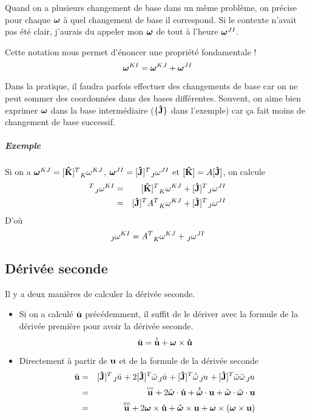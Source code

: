 Quand on a plusieurs changement de base dans un même problème, on précise pour chaque ${\bm \omega}$ à quel changement de base il correspond.
Si le contexte n'avait pas été clair, j'aurais du appeler mon ${\bm \omega}$ de tout à l'heure ${\bm \omega}^{JI}$.

Cette notation nous permet d'énoncer une propriété fondamentale !
\[ {\bm \omega}^{KI} = {\bm \omega}^{KJ} + {\bm \omega}^{JI} \]

Dans la pratique, il faudra parfois effectuer des changements de base car on ne peut sommer des coordonnées dans des bases différentes.
Souvent, on aime bien exprimer ${\bm \omega}$ dans la base intermédiaire ($\{{\bf\hat{J}}\}$ dans l'exemple) car ça fait moins de changement de base successif.

\subparagraph{Exemple}
Si on a $\omegaf^{KJ} = [\uk]^T \wtr{K}{\omega}{KJ}$, $\omegaf^{JI} = [\uj]^T \wtr{J}{\omega}{JI}$ et $[{\bf\hat{K}}] = A[{\bf\hat{J}}]$, on calcule
\begin{eqnarray*}
  [\uj]^T \wtr{J}{\omega}{KI} &=& [\uk]^T \wtr{K}{\omega}{KJ} + [\uj]^T \wtr{J}{\omega}{JI}\\
                              &=& [\uj]^T A^T \wtr{K}{\omega}{KJ} + [\uj]^T \wtr{J}{\omega}{JI}
\end{eqnarray*}
D'où
\[ \wtr{J}{\omega}{KI} = A^T \wtr{K}{\omega}{KJ} + \wtr{J}{\omega}{JI} \]

\subsection{Dérivée seconde}
Il y a deux manières de calculer la dérivée seconde.
\begin{itemize}
  \item
    Si on a calculé $\dot{\bf u}$ précédemment, il suffit de le dériver avec la formule de la dérivée première pour avoir la dérivée seconde.
    \[ \ddot{\bf u} = \mathring{\dot{\bf u}} + {\bm \omega} \times \dot{\bf u} \]
  \item
    Directement à partir de ${\bf u}$ et de la formule de la dérivée seconde
    \begin{eqnarray*}
      \fvdd{u} &=&  [\uj]^T \wrt{J}{\ddot{u}} + 2 [\uj]^T \omegat\wrt{J}{\dot{u}} + [\uj]^T \dot{\omegat}\wrt{J}{u} + [\uj]^T \omegat\omegat\wrt{J}{u}\\
               &=& \fvrr{u} + 2 \omegaft \cdot \fvr{u} + \omegaftr \cdot \fv{u} + \omegaft \cdot \omegaft \cdot \fv{u}\\
               &=& \fvrr{u} + 2 \omegaf \times \fvr{u} + \omegafr \times \fv{u} + \omegaf \times (\omegaf \times \fv{u})
    \end{eqnarray*}
\end{itemize}

